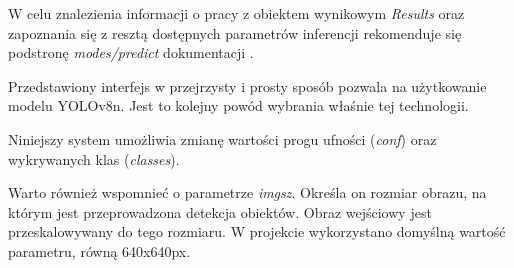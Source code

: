W celu znalezienia informacji o pracy z obiektem wynikowym \emph{Results} oraz zapoznania się z resztą dostępnych parametrów inferencji rekomenduje się podstronę \emph{modes/predict} dokumentacji \cite{yolo_docs}.

Przedstawiony interfejs w przejrzysty i prosty sposób pozwala na użytkowanie modelu YOLOv8n. Jest to kolejny powód wybrania właśnie tej technologii. 

Niniejszy system umożliwia zmianę wartości progu ufności (\emph{conf}) oraz wykrywanych klas (\emph{classes}).

Warto również wspomnieć o parametrze \emph{imgsz}. Określa on rozmiar obrazu, na którym jest przeprowadzona detekcja obiektów. Obraz wejściowy jest przeskalowywany do tego rozmiaru. W projekcie wykorzystano domyślną wartość parametru, równą 640x640px.